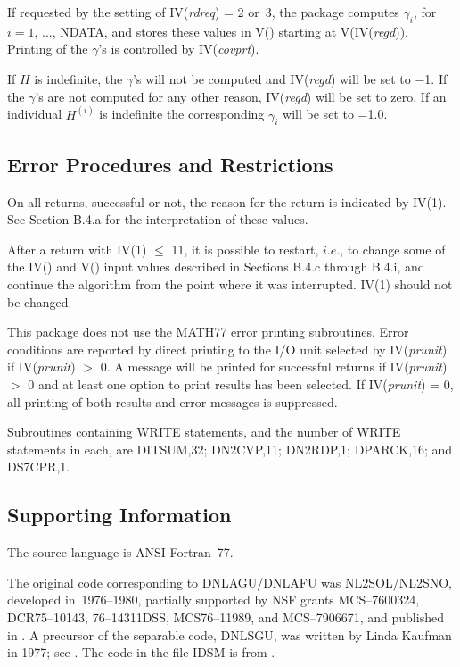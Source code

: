 \documentclass[twoside]{MATH77}
\begin{document}
If requested by the setting of IV({\em rdreq}) = 2 or~3, the package computes $%
\gamma _i$, for $i = 1$, ..., NDATA, and stores these values in V() starting
at V(IV({\em regd})). Printing of the $\gamma $'s is controlled by
IV({\em covprt}).

If $H$ is indefinite, the $\gamma $'s will not be computed and
IV({\em regd}) will be set to $-$1. If the $\gamma $'s are not computed for
any other reason, IV({\em regd}) will be set to zero. If an individual $H^{(i)}$
is indefinite the corresponding $\gamma _i$ will be set to $-$1.0.




\subsection{Error Procedures and Restrictions}

On all returns, successful or not, the reason for the return is indicated by
IV(1). See Section B.4.a for the interpretation of these values.

After a return with IV(1) $\leq$ 11, it is possible to restart, $i.e.$, to
change some of the IV() and V() input values described in Sections B.4.c
through B.4.i, and continue the algorithm from the point where it was
interrupted. IV(1) should not be changed.

This package does not use the MATH77 error printing subroutines. Error
conditions are reported by direct printing to the I/O unit selected by
IV({\em prunit}) if IV({\em prunit}) $>$ 0. A message will be printed for successful
returns if IV({\em prunit}) $>$ 0 and at least one option to print results has been
selected. If IV({\em prunit}) = 0, all printing of both results and error messages
is suppressed.

Subroutines containing WRITE statements, and the number of WRITE statements
in each, are DITSUM,32; DN2CVP,11; DN2RDP,1; DPARCK,16; and DS7CPR,1.

\subsection{Supporting Information}

The source language is ANSI Fortran~77.

The original code corresponding to DNLAGU/DNLAFU was NL2SOL/NL2SNO,
developed in~1976--1980, partially supported by NSF grants MCS--7600324,
DCR75--10143, 76--14311DSS, MCS76--11989, and MCS--7906671, and published
in \cite{Dennis:1981:ANL}.  A precursor of the separable code, DNLSGU, was
written by Linda Kaufman in 1977; see \cite{Kaufman:1975:AVP}.  The code
in the file IDSM is from \cite{Coleman:1984:SES}.
\end{document}
